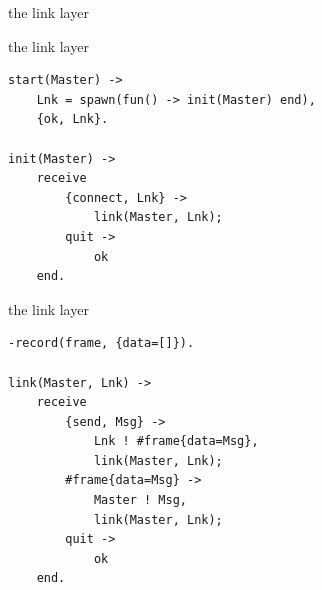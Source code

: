 \begin{frame}{the link layer}


\end{frame}

\begin{frame}[fragile]{the link layer}

\begin{lstlisting}
start(Master) ->
    Lnk = spawn(fun() -> init(Master) end),
    {ok, Lnk}.

init(Master) ->
    receive 
        {connect, Lnk} ->
            link(Master, Lnk);
        quit ->
            ok
    end.
\end{lstlisting}

\end{frame}


\begin{frame}[fragile]{the link layer}

\begin{lstlisting}
-record(frame, {data=[]}).

link(Master, Lnk) ->
    receive 
        {send, Msg} ->
            Lnk ! #frame{data=Msg},
            link(Master, Lnk);
        #frame{data=Msg} ->
            Master ! Msg,
            link(Master, Lnk);
        quit ->
            ok
    end.
\end{lstlisting}

\end{frame}

